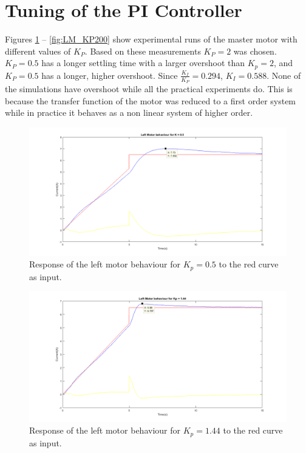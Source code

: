 \FloatBarrier
\section{Tuning of the PI Controller}
Figures \ref{fig:LM_KP050} -- \ref{fig:LM_KP200} show experimental runs of the master motor with different values of $K_P$. Based on these measurements $K_P = 2$ was chosen. $K_P = 0.5$ has a longer settling time with a larger overshoot than $K_p = 2$, and $K_P = 0.5$ has a longer, higher overshoot.  Since $\frac{K_I}{K_P} = 0.294$, $K_I = 0.588$. None of the simulations have overshoot while all the practical experiments do. This is because the transfer function of the motor was reduced to a first order system while in practice it behaves as a non linear system of higher order.
\begin{figure}[htbp]
\centering
\includegraphics[width = .7\textwidth]{pics/LM_KP050.png}
\caption{Response of the left motor behaviour for $K_p = 0.5$ to the red curve as input.}
\label{fig:LM_KP050}
\end{figure}
%
\begin{figure}[htbp]
\centering
\includegraphics[width = \textwidth]{pics/LM_KP144.png}
\caption{Response of the left motor behaviour for $K_p = 1.44$ to the red curve as input.}
\label{fig:LM_KP144}
\end{figure}
%
